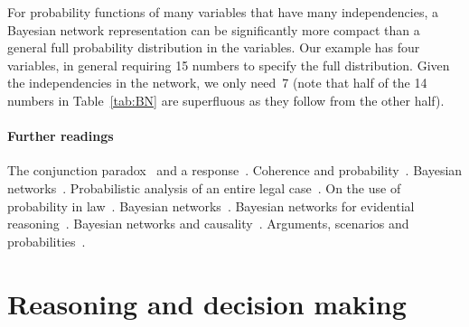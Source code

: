 \documentclass[10pt]{article}
\begin{document}
\noindent For probability functions of many variables that have many independencies, a Bayesian network representation can be significantly more compact than a general full probability distribution in the variables. Our example has four variables, in general requiring 15 numbers to specify the full distribution. Given the independencies in the network, we only need~7 (note that half of the 14 numbers in Table~\ref{tab:BN} are superfluous as they follow from the other half).  


\paragraph{Further readings}
The conjunction paradox~\citep{cohen1977} and a response~\citep{dawid1987}. 
Coherence and probability~\citep{bovensHartman2003}.
Bayesian networks~\citep{taroniEtal2006}. Probabilistic 
analysis of an entire legal case~\citep{kadaneSchum1996,vlekEtal2014}.
On the use of probability in law~\citep{fenton2011}.
Bayesian networks~\citep{pearl1988,darwiche2009,jensenNielsen2007,fentonNeil2013}.
Bayesian networks for evidential reasoning~\citep{taroniEtal2006,heplerEtal2007,fentonNeilLagnado2013}. 
Bayesian networks and causality~\citep{pearl2000,dawid2010}.
Arguments, scenarios and probabilities~\citep{keppensSchafer2006,keppens2012,vlekEtal2016,timmerEtAl2017, verheijEtal2016,verheij2014,verheij2017}. 


\section{Reasoning and decision making}
\label{sec:whenconv}
\label{sec:intexc}

\end{document}
